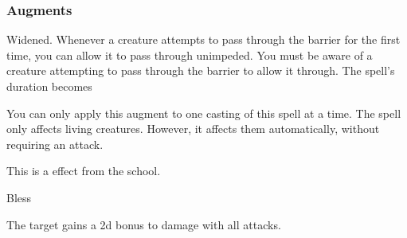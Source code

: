 \subsubsection{Augments}
 Widened.
Whenever a creature attempts to pass through the barrier for the first time, you can allow it to pass through unimpeded.
You must be aware of a creature attempting to pass through the barrier to allow it through.
The spell's duration becomes \durlong
\par
You can only apply this augment to one casting of this spell at a time.
The spell only affects living creatures.
However, it affects them automatically, without requiring an attack.
\par
This is a  effect from the  school.
\begin{spellsection}{Bless}
\begin{spellheader}
\end{spellheader}
\begin{spellcontent}
\begin{spelltargetinginfo}
\end{spelltargetinginfo}
\begin{spelleffects}
\spelleffect The target gains a \plus2d bonus to damage with all attacks.
\spelldur \durshort
\end{spelleffects}
\end{spellcontent}
\begin{spellfooter}
\miscastexplode
\end{spellfooter}
\end{spellsection}

